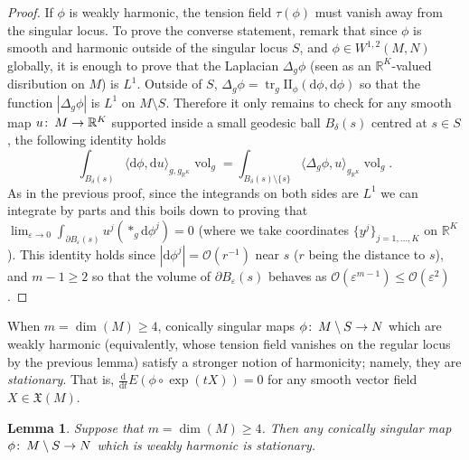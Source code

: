 \documentclass{article}
\numberwithin{equation}{section}        %
\theoremstyle{bfnote}
\newtheorem{lem}[thm]{Lemma}                %
\theoremstyle{definition}
\theoremstyle{bfremark}
\newcommand{\col}{\colon \thinspace}        %
\newcommand{\R}{\mathbb{R}}                 %
\newcommand{\II}{\mathrm{I\!I}}             %
\newcommand{\diff}{\mathrm{d}}                      %
\DeclareMathOperator{\vol}{vol}                 %
\DeclareMathOperator{\tr}{tr}                   %
\begin{document}
\begin{proof}
    If $\phi$ is weakly harmonic, the tension field $\tau(\phi)$ must vanish away from the singular locus. To prove the converse statement, remark that since $\phi$ is smooth and harmonic outside of the singular locus $S$, and $\phi \in W^{1,2}(M,N)$ globally, it is enough to prove that the Laplacian $\Delta_g \phi$ (seen as an $\R^K$-valued disribution on $M$) is $L^1$. Outside of $S$, $\Delta_g \phi = \tr_{g} \II_{\phi}(\diff\phi,\diff\phi)$ so that the function $|\Delta_g \phi|$ is $L^1$ on $M \setminus S$. Therefore it only remains to check for any smooth map $u \col M \rightarrow \R^K$ supported inside a small geodesic ball $B_\delta(s)$ centred at $s \in S$, the following identity holds
    \begin{equation*}
        \int_{B_\delta(s)} \langle \diff\phi, \diff u \rangle_{g,g_{\R^K}} \vol_{g} = \int_{B_\delta(s) \setminus \{s\}} \langle \Delta_g \phi, u \rangle_{g_{\R^K}} \vol_{g} .
    \end{equation*}
    As in the previous proof, since the integrands on both sides are $L^1$ we can integrate by parts and this boils down to proving that $\lim_{\varepsilon \rightarrow 0} \int_{\partial B_\varepsilon(s)} u^j (*_{g}\diff\phi^j)= 0$ (where we take coordinates $\{y^j\}_{j=1,\ldots,K}$ on $\R^K$). This identity holds since $|\diff\phi^j|= \mathcal{O}(r^{-1})$ near $s$ ($r$ being the distance to $s$), and $m-1 \geq 2$ so that the volume of $\partial B_\varepsilon(s)$ behaves as $\mathcal{O}(\varepsilon^{m-1}) \leq \mathcal{O}(\varepsilon^2)$.
\end{proof}

When $m = \dim(M) \geq 4$, conically singular maps $\phi \col M \setminus S \to N$ which are weakly harmonic (equivalently, whose tension field vanishes on the regular locus by the previous lemma) satisfy a stronger notion of harmonicity; namely, they are \emph{stationary}. That is, $\frac{\diff}{\diff t} E(\phi \circ \exp(tX)) = 0$ for any smooth vector field $X \in \mathfrak{X}(M)$.

\begin{lem}     \label{lem: m geq 4}
    Suppose that $m = \dim(M) \geq 4$. Then any conically singular map $\phi \col M \setminus S \to N$ which is weakly harmonic is stationary.
\end{lem}
\end{document}
